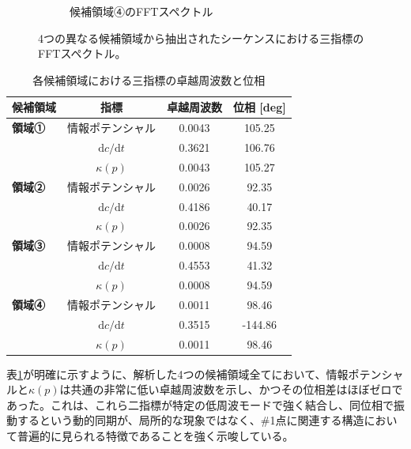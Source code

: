 \documentclass[a4paper,12pt]{article}
\begin{document}
\begin{figure}[H]
\begin{subfigure}{0.48\linewidth}
        \caption{候補領域④のFFTスペクトル}
        \label{fig:supp_fft_region4}
    \end{subfigure}
    \caption{4つの異なる候補領域から抽出されたシーケンスにおける三指標のFFTスペクトル。}
    \label{fig:supp_fft_regions}
\end{figure}

\begin{table}[H]
    \centering
    \caption{各候補領域における三指標の卓越周波数と位相}
    \label{tab:supp_fft_peak_results}
    \begin{tabular}{@{}lccc@{}}
        \toprule
        \textbf{候補領域} & \textbf{指標} & \textbf{卓越周波数} & \textbf{位相 [deg]} \\
        \midrule
        \textbf{領域①} & 情報ポテンシャル & 0.0043 & 105.25 \\
                         & $\mathrm{d}c/\mathrm{d}t$ & 0.3621 & 106.76 \\
                         & $\kappa(p)$ & 0.0043 & 105.27 \\
        \midrule
        \textbf{領域②} & 情報ポテンシャル & 0.0026 & 92.35 \\
                         & $\mathrm{d}c/\mathrm{d}t$ & 0.4186 & 40.17 \\
                         & $\kappa(p)$ & 0.0026 & 92.35 \\
        \midrule
        \textbf{領域③} & 情報ポテンシャル & 0.0008 & 94.59 \\
                         & $\mathrm{d}c/\mathrm{d}t$ & 0.4553 & 41.32 \\
                         & $\kappa(p)$ & 0.0008 & 94.59 \\
        \midrule
        \textbf{領域④} & 情報ポテンシャル & 0.0011 & 98.46 \\
                         & $\mathrm{d}c/\mathrm{d}t$ & 0.3515 & -144.86 \\
                         & $\kappa(p)$ & 0.0011 & 98.46 \\
        \bottomrule
    \end{tabular}
\end{table}

表\ref{tab:supp_fft_peak_results}が明確に示すように、解析した4つの候補領域全てにおいて、情報ポテンシャルと$\kappa(p)$は共通の非常に低い卓越周波数を示し、かつその位相差はほぼゼロであった。これは、これら二指標が特定の低周波モードで強く結合し、同位相で振動するという動的同期が、局所的な現象ではなく、\#1点に関連する構造において普遍的に見られる特徴であることを強く示唆している。
\end{document}
